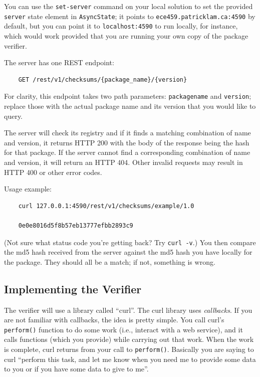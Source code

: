 \documentclass[12pt]{article}
\renewcommand{\_}{\kern-1.5pt\textunderscore\kern-1.5pt}
\begin{document}
\vspace{1em}
You can use the \texttt{set-server} command on your local solution to set the provided \texttt{server} state element in \texttt{AsyncState}; it points to \texttt{ece459.patricklam.ca:4590} by default, but you can point it to \texttt{localhost:4590} to run locally, for instance, which would work provided that you are running your own copy of the package verifier. \par 

\vspace{1em}
The server has one REST endpoint: 
\begin{verbatim}
    GET /rest/v1/checksums/{package_name}/{version}
\end{verbatim}

For clarity, this endpoint takes two path parameters: \texttt{package\_name} and \texttt{version}; replace those with the actual package name and its version that you would like to query.\par

\vspace{1em}
The server will check its registry and if it finds a matching combination of name and version, it returns HTTP 200 with the body of the response being the hash for that package. If the server cannot find a corresponding combination of name and version, it will return an HTTP 404. Other invalid requests may result in HTTP 400 or other error codes. \par

\vspace{1em}
Usage example:

\begin{verbatim}
    curl 127.0.0.1:4590/rest/v1/checksums/example/1.0

    0e0e8016d5f8b57eb13777efbb2893c9
\end{verbatim}

(Not sure what status code you're getting back? Try \verb+curl -v+.) You then compare the md5 hash received from the server against the md5 hash you have locally for the package. They should all be a match; if not, something is wrong.

\subsection*{Implementing the Verifier}

\vspace{1em}
The verifier will use a library called ``curl''. The curl library uses \textit{callbacks}. If you are not familiar with callbacks, the idea is pretty simple. You call curl's \texttt{perform()} function to do some work (i.e., interact with a web service), and it calls functions (which you provide) while carrying out that work. When the work is complete, curl returns from your call to \texttt{perform()}. Basically you are saying to curl ``perform this task, and let me know when you need me to provide some data to you or if you have some data to give to me''.\par
\end{document}
